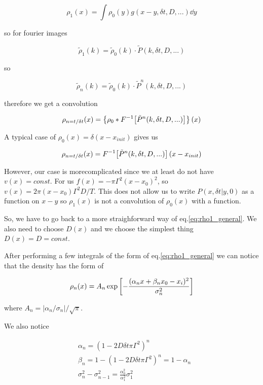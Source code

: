 \documentclass[a4paper,12pt]{article} %
\begin{document}
\begin{equation}
\rho_1(x) = \int \rho_0(y) g(x-y, \delta t, D, ...) \dd y
\end{equation}

so for fourier images

\begin{equation}
\tilde{\rho}_1(k) = \tilde{\rho}_0(k) \cdot \tilde{P}(k, \delta t, D, ...)
\end{equation}

so

\begin{equation}
\tilde{\rho}_n(k) = \tilde{\rho}_0(k) \cdot \tilde{P}^n(k, \delta t, D, ...)
\end{equation}

therefore we get a convolution

\begin{equation}
\rho_{n=t/\delta t}(x) = \qty{\rho_0 * F^{-1}\qty[\tilde{P}^n(k, \delta t, D, ...)]}(x)
\end{equation}

A typical case of $\rho_0(x) = \delta(x - x_{init})$ gives us

\begin{equation}
\rho_{n=t/\delta t}(x) = F^{-1}\qty[\tilde{P}^n(k, \delta t, D, ...)](x - x_{init})
\end{equation}

However, our case is morecomplicated since we at least do not have $v(x) = const$. For us $f(x) = - \pi \Gamma^2 (x - x_0)^2$, so $v(x) = 2 \pi (x - x_0) \Gamma^2 D/T$. This does not allow us to write $P(x, \delta t | y, 0)$ as a function on $x-y$ so $\rho_1(x)$ is not a convolution of $\rho_0(x)$ with a function.

So, we have to go back to a more straighforward way of eq.\eqref{eq:rho1_general}. We also need to choose $D(x)$ and we choose the simplest thing $D(x) = D = const$.

After performing a few integrals of the form of eq.\eqref{eq:rho1_general} we can notice that the density has the form of 

\begin{equation}
\rho_n(x) = A_n \exp \qty[-\frac{(\alpha_n x + \beta_n x_0 - x_i)^2}{\sigma_n^2}]
\end{equation}

where $A_n = |\alpha_n / \sigma_n| / \sqrt{\pi}$.

We also notice 

\begin{equation}
\begin{aligned}
& \alpha_n = (1 - 2 D \delta t \pi \Gamma^2)^n \\
& \beta_n = 1 - (1 - 2 D \delta t \pi \Gamma^2)^n = 1 - \alpha_n \\
& \sigma_n^2 - \sigma_{n-1}^2 = \frac{\alpha_n^2}{\alpha_1^2} \sigma_1^2 \\
\end{aligned}
\end{equation}
\end{document}
